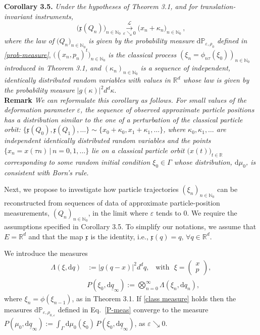 \documentclass[11pt]{article}
\begin{document}
\vspace{0.2cm}
\noindent
{\bf{Corollary 3.5.}}\label{cor:translation_inv}
 \textit{Under the hypotheses of Theorem 3.1, and for translation-invariant instruments,}
$$\big(\mathfrak{x}(Q_n)\big)_{n\in \mathbb{N}_0} \overset{\mathcal{L}}{\underset{\varepsilon \searrow 0}{\longrightarrow}}
\big(x_n + \kappa_n \big)_{n\in \mathbb{N}_0}\,,$$
\textit{where the law of} $\big(Q_n\big)_{n\in \mathbb{N}_0}$ \textit{is given by the probability measure} 
$\text{d}\mathbb{P}_{\varepsilon, \rho_0}$ \textit{defined in \eqref{prob-measure}}, 
$\big((x_n, p_n)^{t}\big)_{n\in \mathbb{N}_0}$ \textit{is the classical process} 
$(\xi_n=\phi_{n\tau}(\xi_0))_{n\in \mathbb{N}_0}$ \textit{introduced in Theorem 3.1, and} 
$(\kappa_n)_{n \in \mathbb{N}_0}$ \textit{is a sequence of independent, 
identically distributed random variables with values in $\mathbb{R}^{d}$ whose law is given by the probability measure} 
$\big| g(\kappa) \big|^{2} d^{d}\kappa$.\\

\smallskip\noindent
{\bf{Remark}} \textit{We can reformulate this corollary as follows. For small values of the deformation 
parameter $\varepsilon$, the sequence of observed approximate particle positions has a distribution 
similar to the one of a perturbation of the classical particle orbit:
$\big\{\mathfrak{x}(Q_0), \mathfrak{x}(Q_1), \dots\big\}\sim\big\{x_0 + \kappa_0, x_1 + \kappa_1, \dots\big\}$,
where $\kappa_0, \kappa_1, \dots $ are independent identically distributed random variables and the points 
$\big\{x_n=x(\tau n)\,\vert\, n=0,1, \dots\big\}$ lie on a classical 
particle orbit $\big(x(t)\big)_{ t\in \mathbb{R}}$ corresponding to some random initial condition $\xi_0\in \Gamma$ 
whose distribution, $\text{d}\mu_0$, is consistent with Born's rule.}

\bigskip
Next, we propose to investigate how particle trajectories $(\xi_n)_{n\in \mathbb{N}_0}$ can be reconstructed 
from sequences of data of approximate particle-position measurements, $(Q_n)_{n\in \mathbb{N}_0}$, in the 
limit where $\varepsilon$ tends to 0. We require the assumptions specified in Corollary 3.5. To simplify our 
notations, we assume that $E= \mathbb{R}^{d}$ and that the map $\mathfrak{x}$ is the identity, i.e., 
$\mathfrak{x}(q)=q, \, \forall q \in \mathbb{R}^{d}$. 

We introduce the measures
\begin{align}\label{mu measure}
\Lambda(\xi, \text{d}q)&:= \big| g(q-x) \big|^{2} d^{d}q, \,\,\,\text{ with }\,\, \xi=\begin{pmatrix} x\\p \end{pmatrix},\\ 
\label{P measure}
&P(\xi_0, \text{d}\underline{q}_{\infty}):= \bigotimes_{n=0}^{\infty} \Lambda(\xi_n, \text{d}q_n), 
\end{align}
where $\xi_n = \phi(\xi_{n-1})$, as in Theorem 3.1. If \eqref{class measure} holds then the measures $\text{d}\mathbb{P}_{\varepsilon, \rho_{0, \varepsilon}}$ 
defined in Eq.~\eqref{P-meas} converge to the measure $P(\mu_{0}, \text{d}\underline{q}_{\infty}):= 
\int_{\Gamma} \text{d}\mu_{0}(\xi_0)\, P(\xi_0, \text{d}\underline{q}_{\infty})$, as $\varepsilon \searrow 0$.
\end{document}
